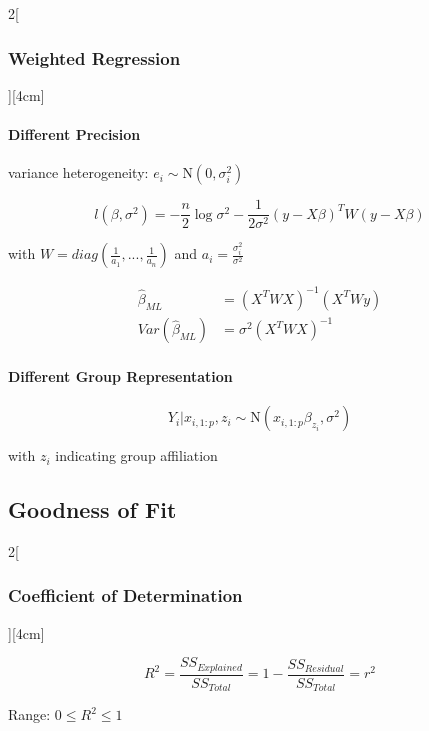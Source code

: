 \documentclass[8pt]{extarticle}
\begin{document}
\begin{multicols}{2}[\subsubsection{Weighted Regression}][4cm]

\paragraph{Different Precision} variance heterogeneity: $e_i \sim \mathrm{N}(0,\sigma_i^2)$

$$l(\beta,\sigma^2) = -\frac{n}{2} \log \sigma^2 - \frac{1}{2\sigma^2}(y-X\beta)^TW(y-X\beta)$$

with $W=diag(\frac{1}{a_1},...,\frac{1}{a_n})$ and $a_i = \frac{\sigma_i^2}{\sigma^2}$

\begin{align*}
\hat{\beta}_{ML} &= (X^TWX)^{-1}(X^TWy) \\
Var(\hat{\beta}_{ML}) &= \sigma^2(X^TWX)^{-1}
\end{align*}


\paragraph{Different Group Representation}

$$Y_i|x_{i,1:p}, z_i \sim \mathrm{N}(x_{i,1:p}\beta_{z_i},\sigma^2)$$

with $z_i$ indicating group affiliation


\end{multicols}





\subsection{Goodness of Fit}

\begin{multicols}{2}[\subsubsection{Coefficient of Determination}][4cm]

$$R^2=\frac{SS_{Explained}}{SS_{Total}}=1-\frac{SS_{Residual}}{SS_{Total}}=r^2$$

Range: $0 \le R^2 \le 1$

\end{multicols}

\end{document}
